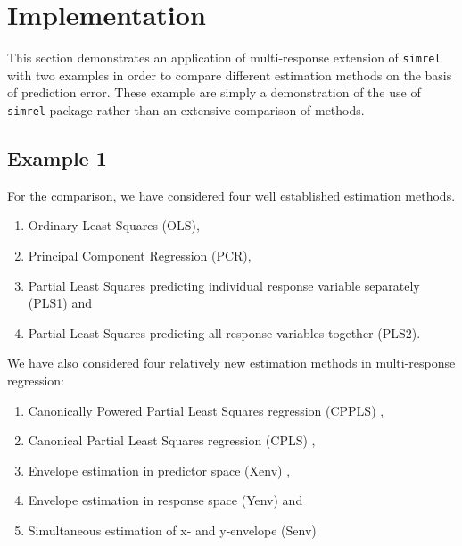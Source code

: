 \documentclass[review]{elsarticle}
\providecommand{\tightlist}{%
  \setlength{\itemsep}{0pt}\setlength{\parskip}{0pt}}
\theoremstyle{definition}
\theoremstyle{definition}
\theoremstyle{definition}
\theoremstyle{remark}
\begin{document}
\hypertarget{implementation}{\section{Implementation}\label{implementation}}

This section demonstrates an application of multi-response extension of
\texttt{simrel} with two examples in order to compare different
estimation methods on the basis of prediction error. These example are
simply a demonstration of the use of \texttt{simrel} package rather than
an extensive comparison of methods.

\subsection{Example 1}\label{example-1}

For the comparison, we have considered four well established estimation
methods.

\begin{enumerate}
\def\labelenumi{\alph{enumi})}
\tightlist
\item
  Ordinary Least Squares (OLS),
\item
  Principal Component Regression (PCR),
\item
  Partial Least Squares predicting individual response variable
  separately (PLS1) and
\item
  Partial Least Squares predicting all response variables together
  (PLS2).
\end{enumerate}

We have also considered four relatively new estimation methods in
multi-response regression:

\begin{enumerate}
\def\labelenumi{\alph{enumi})}
\tightlist
\item
  Canonically Powered Partial Least Squares regression (CPPLS)
  \citep{indahl2009canonical},
\item
  Canonical Partial Least Squares regression (CPLS)
  \citep{indahl2009canonical},
\item
  Envelope estimation in predictor space (Xenv)
  \citep{cook2010envelope},
\item
  Envelope estimation in response space (Yenv)
  \citep{cook2015foundations} and
\item
  Simultaneous estimation of x- and y-envelope (Senv)
  \citep{cook2015simultaneous}
\end{enumerate}
\end{document}
